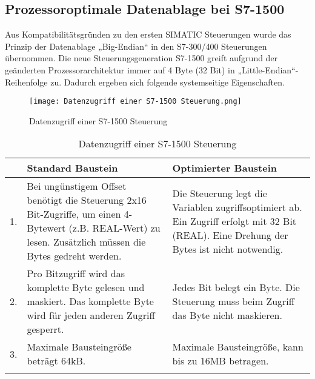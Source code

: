 \subsection{Prozessoroptimale Datenablage bei S7-1500}\label{subsec:Prozessoroptimale Datenablage bei S7-1500}
Aus Kompatibilitätsgründen zu den ersten SIMATIC Steuerungen wurde das Prinzip der Datenablage „Big-Endian“ in den S7-300/400 Steuerungen übernommen. 
Die neue Steuerungsgeneration S7-1500 greift aufgrund der geänderten Prozessorarchitektur immer auf 4 Byte (32 Bit) in „Little-Endian“-Reihenfolge zu. Dadurch ergeben sich folgende systemseitige Eigenschaften.

\begin{figure}[!ht]
    \centering
    \texttt{[image: Datenzugriff einer S7-1500 Steuerung.png]}
    \caption{Datenzugriff einer S7-1500 Steuerung}
    \label{fig:Datenzugriff einer S7-1500 Steuerung}
\end{figure}

\begin{longtable}{| p{} | p{} | p{} | } %
    \hline
     & \textbf{Standard Baustein} & \textbf{Optimierter Baustein}  \\    
    \hline
    1. & Bei ungünstigem Offset benötigt die Steuerung  2x16 Bit-Zugriffe, um einen 4-Bytewert (z.B. REAL-Wert) zu lesen. Zusätzlich müssen die Bytes gedreht werden. & Die Steuerung legt die Variablen zugriffsoptimiert ab. Ein Zugriff erfolgt mit 32 Bit (REAL). Eine Drehung der Bytes ist nicht notwendig.  \\    
    \hline
    2. & Pro Bitzugriff wird das komplette Byte gelesen und maskiert. Das komplette Byte wird für jeden anderen Zugriff gesperrt. & Jedes Bit belegt ein Byte. Die Steuerung muss beim Zugriff das Byte nicht maskieren.\\
    \hline
    3. & Maximale Bausteingröße beträgt 64kB. & Maximale Bausteingröße, kann bis zu 16MB betragen.\\
    \hline
    \caption{Datenzugriff einer S7-1500 Steuerung}\label{tab:Datenzugriff einer S7-1500 Steuerung} %
\end{longtable}

